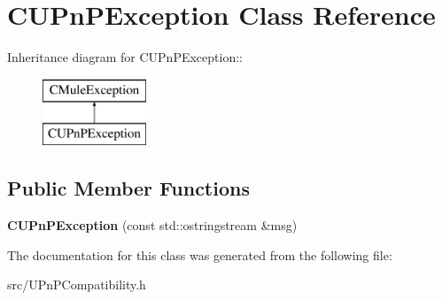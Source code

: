 \section{CUPnPException Class Reference}
\label{classCUPnPException}
Inheritance diagram for CUPnPException::\begin{figure}[H]
\begin{center}
\leavevmode
\includegraphics[height=2cm]{classCUPnPException}
\end{center}
\end{figure}
\subsection*{Public Member Functions}
\begin{DoxyCompactItemize}
\item 
{\bfseries CUPnPException} (const std::ostringstream \&msg)\label{classCUPnPException_a072079003cc50bdee5b5b6b4e3fab8a8}

\end{DoxyCompactItemize}


The documentation for this class was generated from the following file:\begin{DoxyCompactItemize}
\item 
src/UPnPCompatibility.h\end{DoxyCompactItemize}
